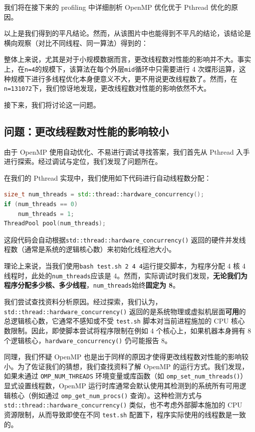 \documentclass[a4paper]{article}
\begin{document}
我们将在接下来的 profiling 中详细剖析 OpenMP 优化优于 Pthread 优化的原因。

以上是我们得到的平凡结论。然而，从该图片中也能得到不平凡的结论，该结论是横向观察（对比不同线程、同一算法）得到的：

整体上来说，尤其是对于小规模数据而言，更改线程数对性能的影响并不大。事实上，在\texttt{n=4}的规模下，该算法在每个外层\texttt{mid}循环中只需要进行 4 次蝶形运算，这种规模下进行多线程优化本身便意义不大，更不用说更改线程数了。然而，在\texttt{n=131072}下，我们惊讶地发现，更改线程数对性能的影响依然不大。

接下来，我们将讨论这一问题。

\subsection{问题：更改线程数对性能的影响较小}

由于 OpenMP 使用自动优化、不易进行调试寻找答案，我们首先从 Pthread 入手进行探索。经过调试与定位，我们发现了问题所在。

在我们的 Pthread 实现中，我们使用如下代码进行自动线程数分配：

\begin{lstlisting}[language=C++]
size_t num_threads = std::thread::hardware_concurrency();
if (num_threads == 0)
    num_threads = 1;
ThreadPool pool(num_threads);
\end{lstlisting}

这段代码会自动根据\texttt{std::thread::hardware\_concurrency()} 返回的硬件并发线程数（通常是系统的逻辑核心数）来初始化线程池大小。

理论上来说，当我们使用\texttt{bash test.sh 2 4 4}运行提交脚本，为程序分配 4 核 4 线程时，此处的\texttt{num\_threads}应该是 4。然而，实际调试时我们发现，\textbf{无论我们为程序分配多少核、多少线程}，\texttt{num\_threads}始终\textbf{固定为 8}。

我们尝试查找资料分析原因。经过探索，我们认为，\texttt{std::thread::hardware\_concurrency()} 返回的是系统物理或虚拟机层面\textbf{可用}的总逻辑核心数，它通常不感知或不受 \texttt{test.sh} 脚本对当前进程施加的 CPU 核心数限制。因此，即使脚本尝试将程序限制在例如 4 个核心上，如果机器本身拥有 8 个逻辑核心，\texttt{hardware\_concurrency()} 仍可能报告 8。

同理，我们怀疑 OpenMP 也是出于同样的原因才使得更改线程数对性能的影响较小。为了佐证我们的猜想，我们查找资料了解 OpenMP 的运行方式。我们发现，如果未通过 \texttt{OMP\_NUM\_THREADS} 环境变量或库函数（如 \texttt{omp\_set\_num\_threads()}）显式设置线程数，OpenMP 运行时库通常会默认使用其检测到的系统所有可用逻辑核心（例如通过 \texttt{omp\_get\_num\_procs()} 查询）。这种检测方式与 \texttt{std::thread::hardware\_concurrency()} 类似，也不考虑外部脚本施加的 CPU 资源限制，从而导致即使在不同 \texttt{test.sh} 配置下，程序实际使用的线程数是一致的。
\end{document}
